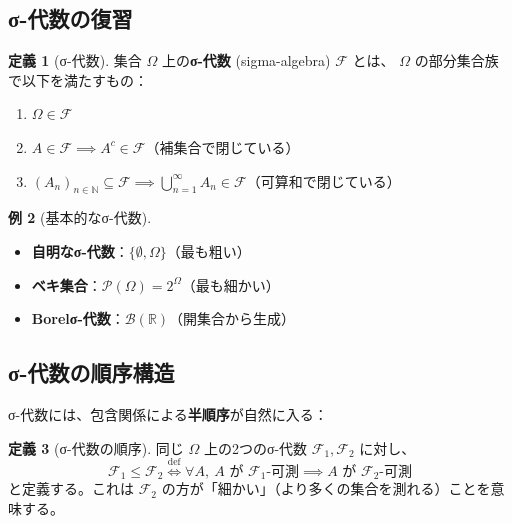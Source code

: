 \documentclass[a4paper,12pt]{ltjsarticle}
\theoremstyle{definition}
\newtheorem{definition}{定義}[section]
\newtheorem{example}[definition]{例}
\begin{document}
\subsection{σ-代数の復習}

\begin{definition}[σ-代数]\label{def:sigma-algebra}
集合 $\Omega$ 上の\textbf{σ-代数} (sigma-algebra) $\mathcal{F}$ とは、
$\Omega$ の部分集合族で以下を満たすもの：
\begin{enumerate}
  \item $\Omega \in \mathcal{F}$
  \item $A \in \mathcal{F} \implies A^c \in \mathcal{F}$（補集合で閉じている）
  \item $(A_n)_{n \in \mathbb{N}} \subseteq \mathcal{F} \implies \bigcup_{n=1}^\infty A_n \in \mathcal{F}$（可算和で閉じている）
\end{enumerate}
\end{definition}

\begin{example}[基本的なσ-代数]
\begin{itemize}
  \item \textbf{自明なσ-代数}：$\{\emptyset, \Omega\}$（最も粗い）
  \item \textbf{ベキ集合}：$\mathcal{P}(\Omega) = 2^\Omega$（最も細かい）
  \item \textbf{Borelσ-代数}：$\mathcal{B}(\mathbb{R})$（開集合から生成）
\end{itemize}
\end{example}

\subsection{σ-代数の順序構造}

σ-代数には、包含関係による\textbf{半順序}が自然に入る：

\begin{definition}[σ-代数の順序]
同じ $\Omega$ 上の2つのσ-代数 $\mathcal{F}_1, \mathcal{F}_2$ に対し、
\[
  \mathcal{F}_1 \leq \mathcal{F}_2 \stackrel{\text{def}}{\iff}
  \forall A,\ A \text{ が } \mathcal{F}_1\text{-可測} \implies A \text{ が } \mathcal{F}_2\text{-可測}
\]
と定義する。これは $\mathcal{F}_2$ の方が「細かい」（より多くの集合を測れる）ことを意味する。
\end{definition}

\begin{center}
\end{center}
\end{document}
